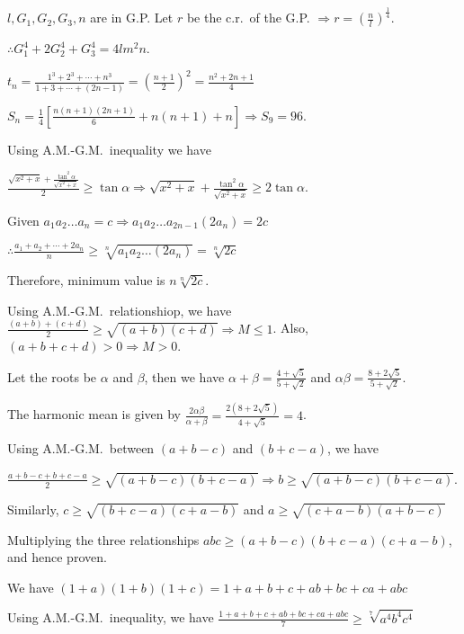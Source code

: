   $l, G_1, G_2, G_3, n$ are in G.P. Let $r$ be the c.r.\ of the G.P. $\Rightarrow r =
  \left(\frac{n}{l}\right)^{\frac{1}{4}}$.

  $\therefore G_1^4 + 2G_2^4 + G_3^4 = 4lm^2n$.
\item $t_n = \frac{1^3 + 2^3 + \cdots + n^3}{1 + 3 + \cdots + (2n - 1)} = \left(\frac{n + 1}{2}\right)^2
  = \frac{n^2 + 2n + 1}{4}$

  $S_n = \frac{1}{4}\left[\frac{n(n + 1)(2n + 1)}{6} + n(n + 1) + n\right] \Rightarrow S_{9} = 96$.
\item Using A.M.-G.M.\ inequality we have

  $\frac{\sqrt{x^2 + x} + \frac{\tan^2\alpha}{\sqrt{x^2 + x}}}{2}\geq \tan\alpha\Rightarrow \sqrt{x^2 + x}
  + \frac{\tan^2\alpha}{\sqrt{x^2 + x}}\geq 2\tan\alpha$.
\item Given $a_1a_2\ldots a_n = c\Rightarrow a_1a_2\ldots a_{2n - 1}(2a_n) = 2c$

  $\therefore \frac{a_1 + a_2 + \cdots + 2a_n}{n}\geq\sqrt[n]{a_1a_2\ldots(2a_n)} = \sqrt[n]{2c}$

  Therefore, minimum value is $n\sqrt[n]{2c}$.
\item Using A.M.-G.M.\ relationshiop, we have $\frac{(a + b) + (c + d)}{2}\geq \sqrt{(a + b)(c + d)}
  \Rightarrow M\leq 1$. Also, $(a + b + c + d) > 0 \Rightarrow M > 0$.
\item Let the roots be $\alpha$ and $\beta$, then we have $\alpha + \beta = \frac{4 + \sqrt{5}}{5 +
  \sqrt{2}}$ and $\alpha\beta = \frac{8 + 2\sqrt{5}}{5 + \sqrt{2}}$.


  The harmonic mean is given by $\frac{2\alpha\beta}{\alpha + \beta} = \frac{2\left(8 + 2\sqrt{5}\right)}{4
    + \sqrt{5}} = 4$.
\item Using A.M.-G.M.\ between $(a + b - c)$ and $(b + c - a)$, we have

  $\frac{a + b - c + b + c - a}{2}\geq \sqrt{(a + b - c)(b + c - a)}\Rightarrow b\geq \sqrt{(a + b - c)(b +
  c - a)}$.

  Similarly, $c\geq \sqrt{(b + c - a)(c + a - b)}$ and $a\geq \sqrt{(c + a - b)(a + b - c)}$

  Multiplying the three relationships $abc \geq (a + b - c)(b + c - a)(c + a - b)$, and hence proven.
\item We have $(1 + a)(1 + b)(1 + c) = 1 + a + b + c + ab + bc + ca + abc$

  Using A.M.-G.M.\ inequality, we have $\frac{1 + a + b + c + ab + bc + ca + abc}{7}\geq
  \sqrt[7]{a^4b^4c^4}$

